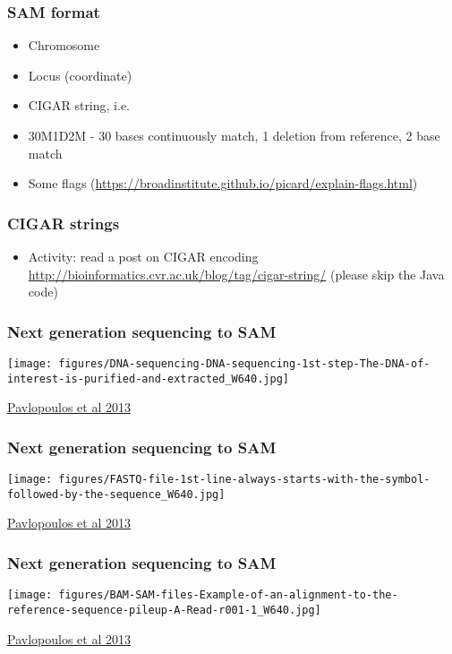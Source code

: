 \documentclass{beamer}
\begin{document}
\begin{frame}
  \frametitle{SAM format}

  \begin{itemize}
  \item  Chromosome
  \item  Locus (coordinate)
  \item  CIGAR string, i.e.
  \item 30M1D2M - 30 bases continuously match, 1 deletion from reference, 2 base match	
  \item  Some flags (\url{https://broadinstitute.github.io/picard/explain-flags.html})

  \end{itemize}

\end{frame}


\begin{frame}
  \frametitle{CIGAR strings}
  \begin{itemize}
  \item Activity: read a post on CIGAR encoding \url{http://bioinformatics.cvr.ac.uk/blog/tag/cigar-string/} (please skip the Java code)
  \end{itemize}
\end{frame}


\begin{frame}
  \frametitle{Next generation sequencing to SAM}
\centering
\texttt{[image: figures/DNA-sequencing-DNA-sequencing-1st-step-The-DNA-of-interest-is-purified-and-extracted\_W640.jpg]}

\href{https://biodatamining.biomedcentral.com/articles/10.1186/1756-0381-6-13}{Pavlopoulos et al 2013}
\end{frame}


\begin{frame}
  \frametitle{Next generation sequencing to SAM}
\centering
\texttt{[image: figures/FASTQ-file-1st-line-always-starts-with-the-symbol-followed-by-the-sequence\_W640.jpg]}

\href{https://biodatamining.biomedcentral.com/articles/10.1186/1756-0381-6-13}{Pavlopoulos et al 2013}
\end{frame}


\begin{frame}
  \frametitle{Next generation sequencing to SAM}
\centering
\texttt{[image: figures/BAM-SAM-files-Example-of-an-alignment-to-the-reference-sequence-pileup-A-Read-r001-1\_W640.jpg]}

\href{https://biodatamining.biomedcentral.com/articles/10.1186/1756-0381-6-13}{Pavlopoulos et al 2013}
\end{frame}
\end{document}

